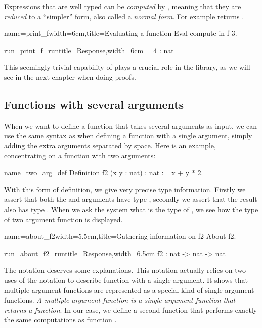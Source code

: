 Expressions that are well typed can be \emph{computed} by \Coq{},
meaning that they are \emph{reduced} to a ``simpler'' form, also
called a \emph{normal form}.
For example  returns .

\begin{coq}{name=print_f}{width=6cm,title=Evaluating a function}
Eval compute in f 3.
\end{coq}
\begin{coqout}{run=print_f_run}{title=Response,width=6cm}
 = 4 : nat
\end{coqout}
This seemingly trivial capability of \Coq{} plays a crucial role
in the \mcbMC{} library, as we will see in the next chapter when
doing proofs.
\subsection{Functions with several arguments}
When we want to define a function that takes several arguments as input, we
can use the same syntax as when defining a function with a single argument,
simply adding the extra arguments separated by space.  Here is an example, 
concentrating on a function with two arguments:

\begin{coq}{name=two_arg_def}{}
Definition f2 (x y : nat) : nat :=
  x + y * 2.
\end{coq}
With this form of definition, we give very precise type information.  Firstly
we assert that both the  and  arguments have type , secondly
we assert that the result also has type .  When we ask the \Coq{}
system what is the type of , we see how the type of two argument
function is displayed.

\begin{coq}{name=about_f2}{width=5.5cm,title=Gathering information on f2}
About f2.
\end{coq}
\begin{coqout}{run=about_f2_run}{title=Response,width=6.5cm}
f2 : nat -> nat -> nat
\end{coqout}
The notation  deserves some explanations.  This
notation actually relies on two uses of the  notation to
describe function with a single argument.  It shows that multiple
argument functions are represented as a special kind of single
argument functions.  {\em A multiple argument function is a single
argument function that returns a function}.  In our case, we define
a second function that performs exactly the same computations as function
.

